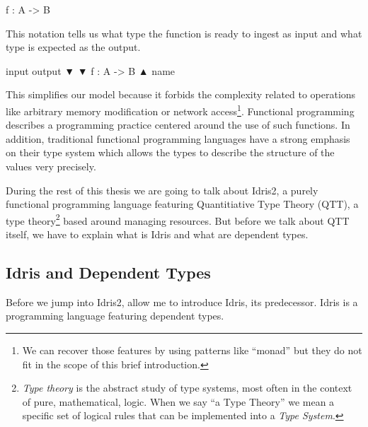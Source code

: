 \documentclass[
]{article}
\newenvironment{Shaded}{}{}
\newcommand{\DataTypeTok}[1]{\textcolor[rgb]{0.56,0.13,0.00}{#1}}
\newcommand{\NormalTok}[1]{#1}
\newcommand{\OperatorTok}[1]{\textcolor[rgb]{0.40,0.40,0.40}{#1}}
\newcommand{\OtherTok}[1]{\textcolor[rgb]{0.00,0.44,0.13}{#1}}
\begin{document}
\begin{Shaded}
\begin{Highlighting}[]
\NormalTok{f }\OperatorTok{:} \DataTypeTok{A} \OtherTok{{-}\textgreater{}} \DataTypeTok{B}
\end{Highlighting}
\end{Shaded}

This notation tells us what type the function is ready to ingest as
input and what type is expected as the output.

\begin{Shaded}
\begin{Highlighting}[]
\NormalTok{input    output}
\NormalTok{    ▼    ▼}
\NormalTok{f }\OperatorTok{:} \DataTypeTok{A} \OtherTok{{-}\textgreater{}} \DataTypeTok{B}
\NormalTok{▲}
\NormalTok{name }
\end{Highlighting}
\end{Shaded}

This simplifies our model because it forbids the complexity related to
operations like arbitrary memory modification or network
access\footnote{We can recover those features by using patterns like
  ``monad'' but they do not fit in the scope of this brief introduction.}.
Functional programming describes a programming practice centered around
the use of such functions. In addition, traditional functional
programming languages have a strong emphasis on their type system which
allows the types to describe the structure of the values very precisely.

During the rest of this thesis we are going to talk about Idris2, a
purely functional programming language featuring Quantitiative Type
Theory (QTT), a type theory\footnote{\emph{Type theory} is the abstract
  study of type systems, most often in the context of pure,
  mathematical, logic. When we say ``a Type Theory'' we mean a specific
  set of logical rules that can be implemented into a \emph{Type
  System}.} based around managing resources. But before we talk about
QTT itself, we have to explain what is Idris and what are dependent
types.

\hypertarget{idris-and-dependent-types}{%
\subsection{Idris and Dependent Types}\label{idris-and-dependent-types}}

Before we jump into Idris2, allow me to introduce Idris\cite{idris1},
its predecessor. Idris is a programming language featuring dependent
types.
\end{document}
